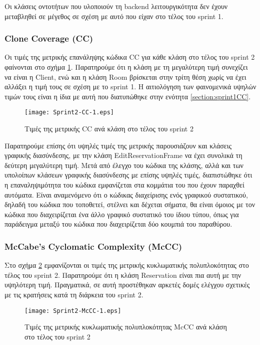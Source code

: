 Οι κλάσεις οντοτήτων που υλοποιούν τη backend λειτουργικότητα δεν έχουν
μεταβληθεί σε μέγεθος σε σχέση με αυτό που είχαν στο τέλος του sprint 1.

\subsubsection{Clone Coverage (CC)}
\label{section:sprint2CC}

Οι τιμές της μετρικής επανάληψης κώδικα CC για κάθε κλάση στο τέλος του
sprint 2 φαίνονται στο σχήμα \ref{fig:sprint2CC}. Παρατηρούμε ότι η
κλάση με τη μεγαλύτερη τιμή συνεχίζει να είναι η Client, ενώ και η κλάση
Room βρίσκεται στην τρίτη θέση χωρίς να έχει
αλλάξει η τιμή τους σε σχέση με το sprint 1. Η αιτιολόγηση των
φαινομενικά υψηλών τιμών τους είναι η ίδια με αυτή που διατυπώθηκε στην
ενότητα \ref{section:sprint1CC}.

\begin{figure}
\centering
\texttt{[image: Sprint2-CC-1.eps]}
\caption{Τιμές της μετρικής CC ανά κλάση στο τέλος του sprint 2}
\label{fig:sprint2CC}
\end{figure}

Παρατηρούμε επίσης ότι υψηλές τιμές της μετρικής παρουσιάζουν και
κλάσεις γραφικής διασύνδεσης, με την κλάση EditReservationFrame να έχει
συνολικά τη δεύτερη μεγαλύτερη τιμή. Μετά από έλεγχο του κώδικα της
κλάσης, αλλά και των υπολοίπων κλάσεων γραφικής διασύνδεσης με επίσης
υψηλές τιμές, διαπιστώθηκε ότι η επαναληψιμότητα του κώδικα εμφανίζεται
στα κομμάτια του που έχουν παραχθεί αυτόματα. Είναι αναμενόμενο ότι ο
κώδικας διαχείρισης ενός γραφικού συστατικού, δηλαδή του κώδικα που
τοποθετεί, στέλνει και δέχεται σήματα, θα είναι όμοιος με τον
κώδικα που διαχειρίζεται ένα άλλο γραφικό συστατικό του ίδιου τύπου,
όπως για παράδειγμα μεταξύ του κώδικα που διαχειρίζεται δύο κουμπιά του
παραθύρου.

\subsubsection{McCabe’s Cyclomatic Complexity (McCC)}
\label{section:sprint2McCC}

Στο σχήμα \ref{fig:sprint2McCC} εμφανίζονται οι τιμές της μετρικής
κυκλωματικής πολυπλοκότητας στο τέλος του sprint 2. Παρατηρούμε ότι η
κλάση Reservation είναι πια αυτή με την υψηλότερη τιμή. Πραγματικά, σε
αυτή προστέθηκαν αρκετές δομές ελέγχου σχετικές με τις κρατήσεις κατά τη
διάρκεια του sprint 2.

\begin{figure}
\centering
\texttt{[image: Sprint2-McCC-1.eps]}
\caption{Τιμές της μετρικής κυκλωματικής πολυπλοκότητας McCC ανά κλάση στο τέλος του sprint 2}
\label{fig:sprint2McCC}
\end{figure}

